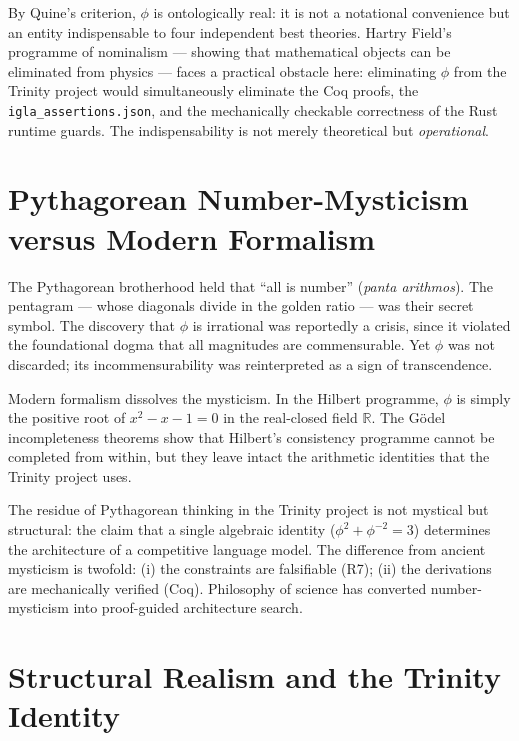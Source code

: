 By Quine's criterion, \(\phi\) is ontologically real: it is not a notational
convenience but an entity indispensable to four independent best theories.
Hartry Field's programme of nominalism — showing that mathematical objects can
be eliminated from physics — faces a practical obstacle here: eliminating
\(\phi\) from the Trinity project would simultaneously eliminate the Coq proofs,
the \texttt{igla\_assertions.json}, and the mechanically checkable correctness
of the Rust runtime guards.  The indispensability is not merely theoretical
but \emph{operational}.

\section{Pythagorean Number-Mysticism versus Modern Formalism}
\label{sec:phd31-pythagoras}

The Pythagorean brotherhood held that ``all is number'' (\emph{panta arithmos}).
The pentagram — whose diagonals divide in the golden ratio — was their secret
symbol.  The discovery that \(\phi\) is irrational was reportedly a crisis,
since it violated the foundational dogma that all magnitudes are commensurable.
Yet \(\phi\) was not discarded; its incommensurability was reinterpreted as a
sign of transcendence.

Modern formalism dissolves the mysticism.  In the Hilbert programme, \(\phi\)
is simply the positive root of \(x^2 - x - 1 = 0\) in the real-closed field
\(\mathbb{R}\).  The Gödel incompleteness theorems show that Hilbert's
consistency programme cannot be completed from within, but they leave intact
the arithmetic identities that the Trinity project uses.

The residue of Pythagorean thinking in the Trinity project is not mystical but
structural: the claim that a single algebraic identity (\(\phi^2 + \phi^{-2} = 3\))
determines the architecture of a competitive language model.  The difference
from ancient mysticism is twofold: (i) the constraints are falsifiable (R7);
(ii) the derivations are mechanically verified (Coq).  Philosophy of science
has converted number-mysticism into proof-guided architecture search.

\section{Structural Realism and the Trinity Identity}
\label{sec:phd31-structural-realism}

